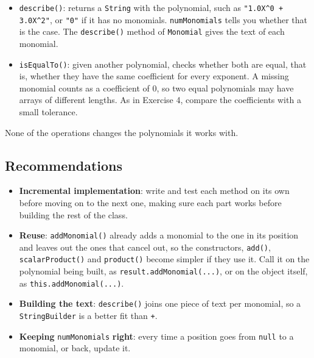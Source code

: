 \begin{itemize}
\begin{itemize}
            \item \texttt{describe()}: returns a \texttt{String} with the polynomial, such as \texttt{"1.0X\textasciicircum{}0 + 3.0X\textasciicircum{}2"}, or \texttt{"0"} if it has no monomials. \texttt{numMonomials} tells you whether that is the case. The \texttt{describe()} method of \texttt{Monomial} gives the text of each monomial.

            \item \texttt{isEqualTo()}: given another polynomial, checks whether both are equal, that is, whether they have the same coefficient for every exponent. A missing monomial counts as a coefficient of 0, so two equal polynomials may have arrays of different lengths. As in Exercise 4, compare the coefficients with a small tolerance.

        \end{itemize}

\end{itemize}

None of the operations changes the polynomials it works with.

\subsection{Recommendations}

\begin{itemize}

    \item \textbf{Incremental implementation}: write and test each method on its own before moving on to the next one, making sure each part works before building the rest of the class.

    \item \textbf{Reuse}: \texttt{addMonomial()} already adds a monomial to the one in its position and leaves out the ones that cancel out, so the constructors, \texttt{add()}, \texttt{scalarProduct()} and \texttt{product()} become simpler if they use it. Call it on the polynomial being built, as \texttt{result.addMonomial(...)}, or on the object itself, as \texttt{this.addMonomial(...)}.

    \item \textbf{Building the text}: \texttt{describe()} joins one piece of text per monomial, so a \texttt{StringBuilder} is a better fit than \texttt{+}.

    \item \textbf{Keeping} \texttt{numMonomials} \textbf{right}: every time a position goes from \texttt{null} to a monomial, or back, update it.

\end{itemize}

